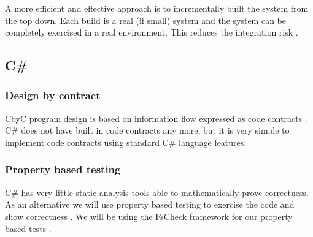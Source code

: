 A more efficient and effective approach is to incrementally built the system from
the top down. Each build is a real (if small) system and the system can be completely 
exercised in a real environment. This reduces the integration risk \parencite{CbyCPraxis}.

\subsection{C\#}

\subsubsection{Design by contract}
CbyC program design is based on information flow expressed as code contracts 
\parencite{CbyCMan}. C\# does not have built in code contracts any more, but it
is very simple to implement code contracts using standard C\# language features.

\subsubsection{Property based testing}
C\# has very little static analysis tools able to mathematically prove correctness.
As an alternative we will use property based testing to exercise the code and show 
correctness \parencite{QuickCheck} \parencite{Hamlet94randomtesting}. We will be
using the FsCheck framework for our property based tests \parencite{FsCheck_home}.  
